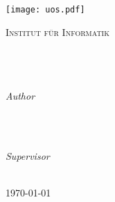 %
%
%
%
%
%

\begin{titlepage}
	\centering
	\thispagestyle{empty}
	\begin{center}
	\texttt{[image: uos.pdf]}
	\end{center}
	\LARGE{\textsc{Institut für Informatik}}
	\vfill
	\textsc{\Large{\emph{\mycourse}}}\\[0.5cm]
	\HRule\\[0.4cm]
	\vspace{8mm}
	\huge{\textbf{{\selectfont
	\myMaintitle}}}\\
	\HRule\\[0.4cm]
	\vspace{9mm}

	\begin{minipage}{0.4\textwidth}
		\begin{flushleft}
			\large
			\textit{Author}\\
			\textsc{\myName}\\ %
			\textsc{\myMatrikel} %
		\end{flushleft}
	\end{minipage}
	~
	\begin{minipage}{0.4\textwidth}
		\begin{flushright}
			\large
			\textit{Supervisor}\\
			\textsc{\fistSupervisor}\\ %
			\textsc{\secSupervisor} %
		\end{flushright}
	\end{minipage}

	\vspace{5cm}
	\large{\today}
	\vfill
	\end{titlepage}
	\newpage
